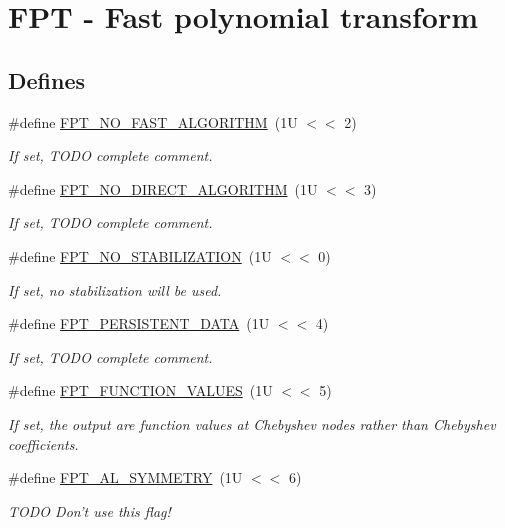 \hypertarget{group__fpt}{
\section{FPT - Fast polynomial transform}
\label{group__fpt}
}
\subsection*{Defines}
\begin{CompactItemize}
\item 
\#define \hyperlink{group__fpt_g33b9330253f419a91ef09a1b0d7a2667}{FPT\_\-NO\_\-FAST\_\-ALGORITHM}~(1U $<$$<$ 2)
\begin{CompactList}\small\item\em If set, TODO complete comment. \item\end{CompactList}\item 
\#define \hyperlink{group__fpt_gdbf3440a08ccd763556ff4caa36693d9}{FPT\_\-NO\_\-DIRECT\_\-ALGORITHM}~(1U $<$$<$ 3)
\begin{CompactList}\small\item\em If set, TODO complete comment. \item\end{CompactList}\item 
\#define \hyperlink{group__fpt_g43cffc40fea4280ae0bcbe948109a3be}{FPT\_\-NO\_\-STABILIZATION}~(1U $<$$<$ 0)
\begin{CompactList}\small\item\em If set, no stabilization will be used. \item\end{CompactList}\item 
\#define \hyperlink{group__fpt_g1ee771544214aba96ee012095feeead1}{FPT\_\-PERSISTENT\_\-DATA}~(1U $<$$<$ 4)
\begin{CompactList}\small\item\em If set, TODO complete comment. \item\end{CompactList}\item 
\#define \hyperlink{group__fpt_gd5594ac14b8a368f0103761361af5691}{FPT\_\-FUNCTION\_\-VALUES}~(1U $<$$<$ 5)
\begin{CompactList}\small\item\em If set, the output are function values at Chebyshev nodes rather than Chebyshev coefficients. \item\end{CompactList}\item 
\hypertarget{group__fpt_gba75cd704c2ca4153c1733b4cb3c977f}{
\#define \hyperlink{group__fpt_gba75cd704c2ca4153c1733b4cb3c977f}{FPT\_\-AL\_\-SYMMETRY}~(1U $<$$<$ 6)}
\label{group__fpt_gba75cd704c2ca4153c1733b4cb3c977f}

\begin{CompactList}\small\item\em TODO Don't use this flag! \item\end{CompactList}\end{CompactItemize}
